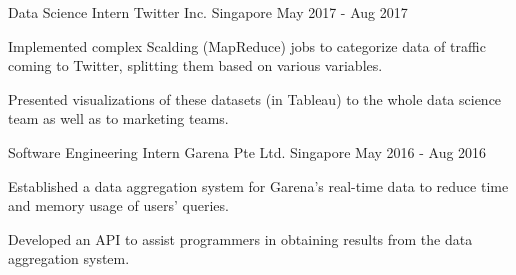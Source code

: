 \begin{cventries}
  \cventry
  {Data Science Intern} %
  {Twitter Inc.} %
  {Singapore} %
  {May 2017 - Aug 2017} %
  {
    \begin{cvitems} %
    \item {Implemented complex Scalding (MapReduce) jobs to categorize data of traffic coming to Twitter, splitting them based on various variables.}
    \item {Presented visualizations of these datasets (in Tableau) to the whole data science team as well as to marketing teams.}
    \end{cvitems}
  }

  \cventry
  {Software Engineering Intern} %
  {Garena Pte Ltd.} %
  {Singapore} %
  {May 2016 - Aug 2016} %
  {
    \begin{cvitems} %
    \item {Established a data aggregation system for Garena's real-time data to reduce time and memory usage of users' queries.}
    \item {Developed an API to assist programmers in obtaining results from the data aggregation system.}
    \end{cvitems}
  }

\end{cventries}
